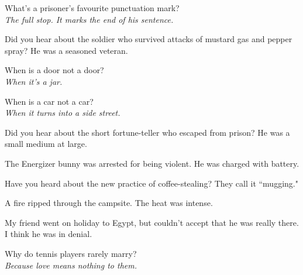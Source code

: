 \begin{itemise}
\item What's a prisoner's favourite punctuation mark?\\
\textit{The full stop. It marks the end of his sentence.}


\item Did you hear about the soldier who survived attacks of mustard gas and pepper spray? He was a seasoned veteran.


\item When is a door not a door?\\
\textit{When it's a jar.}

\item When is a car not a car?\\
\textit{When it turns into a side street.}

\item Did you hear about the short fortune-teller who escaped from prison? He was a small medium at large.

\item The Energizer bunny was arrested for being violent. He was charged with battery.

\item Have you heard about the new practice of coffee-stealing? They call it ``mugging."

\item A fire ripped through the campsite. The heat was intense.

\item My friend went on holiday to Egypt, but couldn't accept that he was really there. I think he was in denial.


\item Why do tennis players rarely marry?\\
\textit{Because love means nothing to them.}

\end{itemise}

